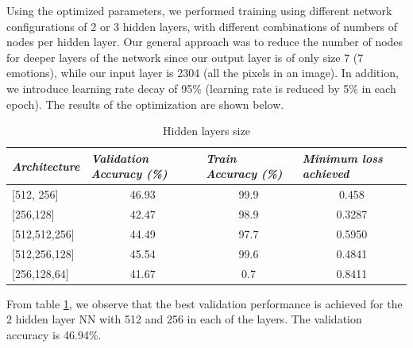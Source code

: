 \documentclass[12pt,twoside]{article}
\begin{document}
Using the optimized parameters, we performed training using different network configurations of 2 or 3 hidden layers,  with different combinations of numbers of nodes per hidden layer. Our general approach was to reduce the number of nodes for deeper layers of the network since our output layer is of only size 7 (7 emotions), while our input layer is 2304 (all the pixels in an image). In addition, we introduce learning rate decay of 95\% (learning rate is reduced by 5\% in each epoch). The results of the optimization are shown below.

\begin{table}[!htbp]
\centering
\begin{tabular}{|l|c|c|c|}
\hline
\textit{\textbf{Architecture}} & \multicolumn{1}{l|}{\textit{\textbf{Validation Accuracy (\%)}}} & \multicolumn{1}{l|}{\textit{\textbf{Train Accuracy (\%)}}} & \multicolumn{1}{l|}{\textit{\textbf{Minimum loss achieved}}} \\ \hline
{[}512, 256{]}                 & 46.93                                                           & 99.9                                                       & 0.458                                                        \\ \hline
{[}256,128{]}                  & 42.47                                                           & 98.9                                                       & 0.3287                                                       \\ \hline
{[}512,512,256{]}              & 44.49                                                           & 97.7                                                       & 0.5950                                                       \\ \hline
{[}512,256,128{]}              & 45.54                                                           & 99.6                                                       & 0.4841                                                       \\ \hline
{[}256,128,64{]}               & 41.67                                                           & 0.7                                                        & 0.8411                                                       \\ \hline
\end{tabular}
\caption{Hidden layers size}
\label{layers}
\end{table}

From table \ref{layers}, we observe that the best validation performance is achieved for the 2 hidden layer NN with 512 and 256 in each of the layers. The validation accuracy is 46.94\%. 
\end{document}
